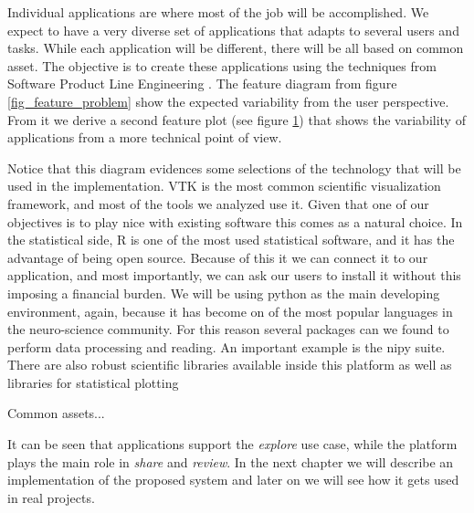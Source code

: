 Individual applications are where most of the job will be accomplished. We expect to have a very diverse set of applications that adapts to several users and tasks. While each application will be different, there will be all based on common asset. The objective is to create these applications using the techniques from Software Product Line Engineering \autocite{pohl_software_2005}. The feature diagram from figure \ref{fig_feature_problem} show the expected variability from the user perspective. From it we derive a second feature plot (see figure \ref{fig_feature_solution}) that shows the variability of applications from a more technical point of view.  

\begin{figure}

\caption{\label{fig_feature_solution}}
\end{figure}

Notice that this diagram evidences some selections of the technology that will be used in the implementation. VTK \autocite{schroeder_vtk_1998} is the most common scientific visualization framework, and most of the tools we analyzed use it. Given that one of our objectives is to play nice with existing software this comes as a natural choice. In the statistical side, R \autocite{team_r:_2012} is one of the most used statistical software, and it has the advantage of being open source. Because of this it we can connect it to our application, and most importantly, we can ask our users to install it without this imposing a financial burden. We will be using python as the main developing environment, again, because it has become on of the most popular languages in the neuro-science  community. For this reason several packages can we found to perform data processing and reading. An important example is the nipy  suite. There are also robust scientific libraries \autocite{van_der_walt_numpy_2011, jones_scipy:_2001,mckinney_data_2010} available inside this platform as well as libraries for statistical plotting \autocite{hunter_matplotlib:_2007, michael_waskom_seaborn:_2015}

Common assets...

%
%

\bigskip

It can be seen that applications support the \emph{explore} use case, while the platform plays the main role in \emph{share} and \emph{review}. In the next chapter we will describe an implementation of the proposed system and later on we will see how it gets used in real projects.
